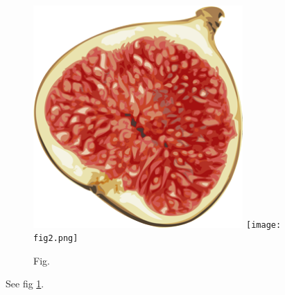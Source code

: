 
  \begin{figure}[h]
    \includegraphics[width=8cm]{fig.png}
    \texttt{[image: fig2.png]}
    \caption{Fig.}
    \label{fig:fig}
  \end{figure}
  See fig \ref{fig:fig}.

